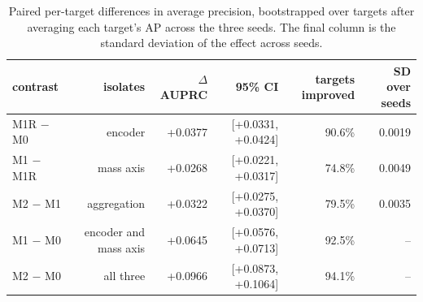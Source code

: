 \begin{table}[htbp]
\centering
\caption{Paired per-target differences in average precision, bootstrapped over targets after averaging each target's AP across the three seeds. The final column is the standard deviation of the effect across seeds.}
\label{tab:table2_effects}
\begin{tabular}{l r r r r r}
\toprule
contrast & isolates & $\Delta$ AUPRC & 95\% CI & targets improved & SD over seeds \\
\midrule
M1R $-$ M0 & encoder & +0.0377 & [+0.0331, +0.0424] & 90.6\% & 0.0019 \\
M1 $-$ M1R & mass axis & +0.0268 & [+0.0221, +0.0317] & 74.8\% & 0.0049 \\
M2 $-$ M1 & aggregation & +0.0322 & [+0.0275, +0.0370] & 79.5\% & 0.0035 \\
M1 $-$ M0 & encoder and mass axis & +0.0645 & [+0.0576, +0.0713] & 92.5\% & -- \\
M2 $-$ M0 & all three & +0.0966 & [+0.0873, +0.1064] & 94.1\% & -- \\
\bottomrule
\end{tabular}
\end{table}
